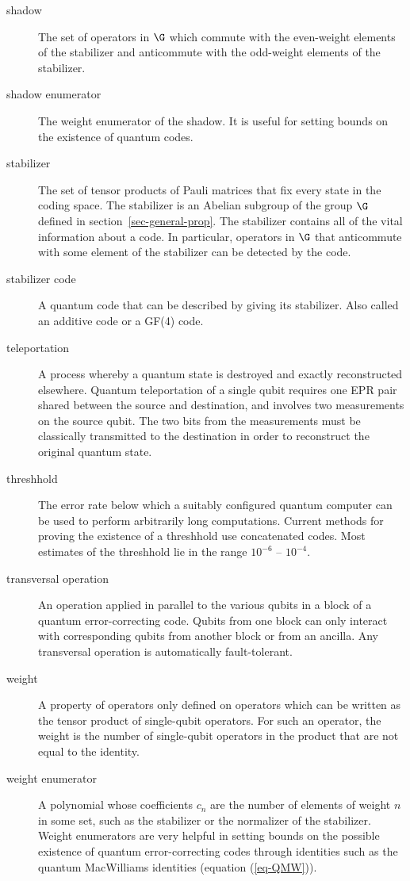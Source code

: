 \begin{description}
	\item[shadow] The set of operators in $\G$ which commute with the
	even-weight elements of the stabilizer and anticommute with the odd-weight
	elements of the stabilizer.

	\item[shadow enumerator] The weight enumerator of the shadow.  It is useful
	for setting bounds on the existence of quantum codes.

	\item[stabilizer] The set of tensor products of Pauli matrices that fix
	every state in the coding space.  The stabilizer is an Abelian subgroup
	of the group $\G$ defined in section~\ref{sec-general-prop}.  The stabilizer
	contains all of the vital information about a code.  In particular, operators
	in $\G$ that anticommute with some element of the stabilizer can be
	detected by the code.

	\item[stabilizer code] A quantum code that can be described by giving its
	stabilizer.  Also called an additive code or a GF(4) code.

	\item[teleportation] A process whereby a quantum state is destroyed and exactly
	reconstructed elsewhere.  Quantum teleportation of a single qubit requires
	one EPR pair shared between the source and destination, and involves two
	measurements on the source qubit.  The two bits from the measurements must be
	classically transmitted to the destination in order to reconstruct the original
	quantum state.

	\item[threshhold] The error rate below which a suitably configured quantum
	computer can be used to perform arbitrarily long computations.  Current
	methods for proving the existence of a threshhold use concatenated codes.
	Most estimates of the threshhold lie in the range $10^{-6}$ -- $10^{-4}$.

	\item[transversal operation] An operation applied in parallel to the
	various qubits in a block of a quantum error-correcting code.  Qubits
	from one block can only interact with corresponding qubits from another
	block or from an ancilla.  Any transversal operation is automatically
	fault-tolerant.

	\item[weight] A property of operators only defined on operators which
	can be written as the tensor product of single-qubit operators.  For such
	an operator, the weight is the number of single-qubit operators in the
	product that are not equal to the identity.

	\item[weight enumerator] A polynomial whose coefficients $c_n$ are the number
	of elements of weight $n$ in some set, such as the stabilizer or
	the normalizer of the stabilizer.  Weight enumerators are very helpful
	in setting bounds on the possible existence of quantum error-correcting
	codes through identities such as the quantum MacWilliams identities (equation
	(\ref{eq-QMW})).

\end{description}